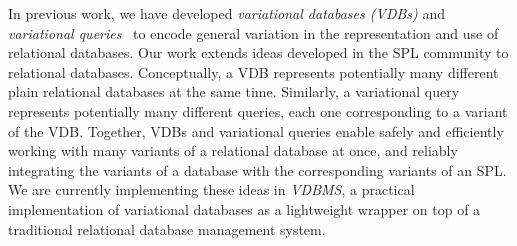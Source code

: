 \begin{comment}
In a database-supported SPL, 
typically a number of strategies are employed to
accommodate the different information needs of different variants.
%
The first is that a different relational database may be \emph{specified and
created per-variant}, according to the information needs of each
variant~\cite{marco13featureAdaptSch}. 
This approach is labor-intensive and difficult to maintain
since changes need to be propagated across variants manually.
%
The second strategy is to define a single \emph{global schema that applies
to all variants}~\cite{batini86dbSchIntegAnalysis}. 
This strategy is more efficient to maintain compared to the previous approach
but is still hard to maintain,
especially in face of SPL evolution. Due to lack of separation of concerns
and suboptimal traceability of requirements to database elements~\cite{skrhas09DBIS}
it is also complex, hard to understand, and unscalable~\cite{slrs12CAiSE}. 
Additionally, it suffers from design limitation and 
error-proneness since parts of the schema will be irrelevant to each variant,
resulting in losing database's integrity constraints~\cite{slrs12CAiSE}.
%
The third strategy is to define a \emph{variable data model}~\cite{skrhas09DBIS, 
slrs12CAiSE, ad11varDataModel} which models a database schema 
(usually as an Entity-Relation model) with
annotations of features from SPL to indicate their variable existence. 
This approach addresses problems of the previous approach, however,
it does not address the variation that appears in queries and data. 
Thus, developers have to write the required information need as a
query encoded as a string per variant. Not only this is labor-some but
also due to the nature of queries being encoded as strings there is no
static check to ensure that queries are type correct. 
\end{comment}

In previous work, we have developed \emph{variational databases (VDBs)} and
\emph{variational queries}~\cite{ATW18poly,ATW17dbpl} to encode general
variation in the representation and use of relational databases. Our work
extends ideas developed in the SPL community to 
relational databases.
%
Conceptually, a VDB represents potentially many different plain relational
databases at the same time. Similarly, a variational query represents
potentially many different queries, each one corresponding to a variant of the
VDB.
%
Together, VDBs and variational queries enable safely and efficiently working
with many variants of a relational database at once, and reliably integrating
the variants of a database with the corresponding variants of an SPL.
%
We are currently implementing these ideas in \emph{VDBMS}, a practical
implementation of variational databases as a lightweight wrapper on top of a
traditional relational database management system.


